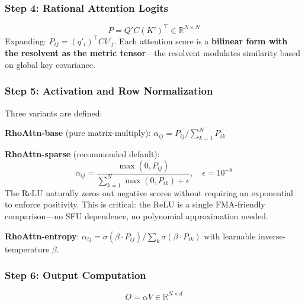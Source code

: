 \documentclass[11pt,a4paper]{article}
\theoremstyle{remark}
\begin{document}
\subsubsection{Step 4: Rational Attention Logits}
\begin{equation}
P = Q' C (K')^\top \in \mathbb{R}^{N \times N}
\label{eq:logits}
\end{equation}
Expanding: $P_{ij} = (q'_i)^\top C k'_j$. Each attention score is a \textbf{bilinear form with the resolvent as the metric tensor}---the resolvent modulates similarity based on global key covariance.

\subsubsection{Step 5: Activation and Row Normalization}

Three variants are defined:

\textbf{RhoAttn-base} (pure matrix-multiply):
$\alpha_{ij} = P_{ij} / \sum_{k=1}^N P_{ik}$

\textbf{RhoAttn-sparse} (recommended default):
\begin{equation}
\alpha_{ij} = \frac{\max(0, P_{ij})}{\sum_{k=1}^N \max(0, P_{ik}) + \epsilon}, \quad \epsilon = 10^{-8}
\label{eq:sparse}
\end{equation}
The ReLU naturally zeros out negative scores without requiring an exponential to enforce positivity. This is critical: the ReLU is a single FMA-friendly comparison---no SFU dependence, no polynomial approximation needed.

\textbf{RhoAttn-entropy}: $\alpha_{ij} = \sigma(\beta \cdot P_{ij}) / \sum_k \sigma(\beta \cdot P_{ik})$ with learnable inverse-temperature $\beta$.

\subsubsection{Step 6: Output Computation}
\begin{equation}
O = \alpha V \in \mathbb{R}^{N \times d}
\end{equation}
\end{document}
